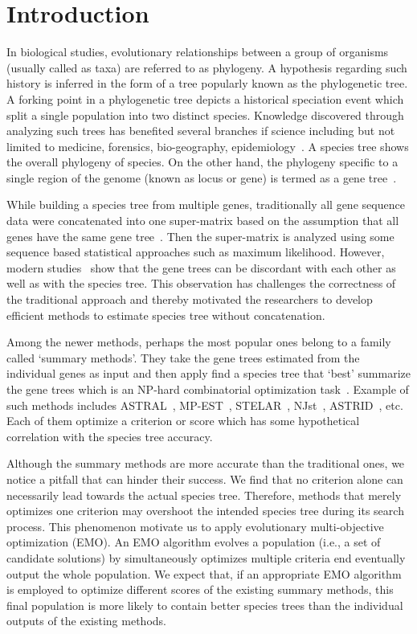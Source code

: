 \section{Introduction}
In biological studies, evolutionary relationships between a group of organisms (usually called as taxa) are referred to as phylogeny. A hypothesis regarding such history is inferred in the form of a tree popularly known as the phylogenetic tree. A forking point in a phylogenetic tree depicts a historical speciation event which split a single population into two distinct species.  Knowledge discovered through analyzing such trees has benefited several branches if science including but not limited to medicine, forensics, bio-geography, epidemiology~\cite{felix2015phylogenetics}. A species tree shows the overall phylogeny of species. On the other hand, the phylogeny specific to a single region of the genome (known as locus or gene) is termed as a gene tree~\cite{maddison1997gene}. 

While building a species tree from multiple genes, traditionally all gene sequence data were concatenated into one super-matrix based on the assumption that all genes have the same gene tree~\cite{huelsenbeck1996combining, de2007supermatrix}. Then the super-matrix is analyzed using some sequence based statistical approaches such as maximum likelihood. However, modern studies~\cite{zwickl2014disentangling, jarvis2014whole} show that the gene trees can be discordant with each other as well as with the species tree. This observation has challenges the correctness of the traditional approach and thereby motivated the researchers to develop efficient methods to estimate species tree without concatenation. 

Among the newer methods, perhaps the most popular ones belong to a family called `summary methods'. They take the gene trees estimated from the individual genes as input and then apply find a species tree that `best' summarize the gene trees which is an NP-hard combinatorial optimization task~\cite{mirarab2014astral}. Example of such methods includes ASTRAL~\cite{mirarab2014astral}, MP-EST~\cite{liu2010maximum}, STELAR~\cite{bibid}, NJst~\cite{liu2011estimating}, ASTRID~\cite{vachaspati2015astrid}, etc. Each of them optimize a criterion or score which has some hypothetical correlation with the species tree accuracy. 

Although the summary methods are more accurate than the traditional ones, we notice a pitfall that can hinder their success. We find that no criterion alone can necessarily lead towards the actual species tree. Therefore, methods that merely optimizes one criterion may overshoot the intended species tree during its search process. This phenomenon motivate us to apply evolutionary multi-objective optimization (EMO). An EMO algorithm evolves a population (i.e., a set of candidate solutions) by simultaneously optimizes multiple criteria end eventually output the whole population. We expect that, if an appropriate EMO algorithm is employed to optimize different scores of the existing summary methods, this final population is more likely to contain better species trees than the individual outputs of the existing methods. 

